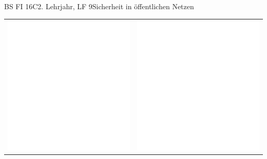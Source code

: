 \documentclass[oneside,openany,headings=optiontotoc,11pt,numbers=noenddot]{scrreprt}
\begin{document}
\begin{worksheet}{BS FI 16C}{2. Lehrjahr, LF 9}{Sicherheit in öffentlichen Netzen}
\begin{framed}
\begin{tabularx}{\textwidth}{|X|X|}
				\bigskip\includegraphics[scale=0.05]{../empty.jpg} & \bigskip\includegraphics[scale=0.05]{../empty.jpg} \\

\end{tabularx}
\end{framed}
\end{worksheet}
\end{document}
